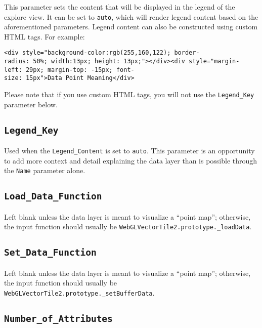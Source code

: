 \documentclass[
]{book}
\begin{document}
This parameter sets the content that will be displayed in the legend of the explore view. It can be set to \texttt{auto}, which will render legend content based on the aforementioned parameters. Legend content can also be constructed using custom HTML tags. For example:

\texttt{\textless{}div\ style="background-color:rgb(255,160,122);\ border-radius:\ 50\%;\ width:13px;\ height:\ 13px;"\textgreater{}\textless{}/div\textgreater{}\textless{}div\ style="margin-left:\ 29px;\ margin-top:\ -15px;\ font-size:\ 15px"\textgreater{}Data\ Point\ Meaning\textless{}/div\textgreater{}}

Please note that if you use custom HTML tags, you will not use the \texttt{Legend\_Key} parameter below.

\hypertarget{legend_key}{%
\subsection*{\texorpdfstring{\texttt{Legend\_Key}}{Legend\_Key}}\label{legend_key}}


Used when the \texttt{Legend\_Content} is set to \texttt{auto}. This parameter is an opportunity to add more context and detail explaining the data layer than is possible through the \texttt{Name} parameter alone.

\hypertarget{load_data_function}{%
\subsection*{\texorpdfstring{\texttt{Load\_Data\_Function}}{Load\_Data\_Function}}\label{load_data_function}}


Left blank unless the data layer is meant to visualize a ``point map''; otherwise, the input function should usually be \texttt{WebGLVectorTile2.prototype.\_loadData}.

\hypertarget{set_data_function}{%
\subsection*{\texorpdfstring{\texttt{Set\_Data\_Function}}{Set\_Data\_Function}}\label{set_data_function}}


Left blank unless the data layer is meant to visualize a ``point map''; otherwise, the input function should usually be \texttt{WebGLVectorTile2.prototype.\_setBufferData}.

\hypertarget{number_of_attributes}{%
\subsection*{\texorpdfstring{\texttt{Number\_of\_Attributes}}{Number\_of\_Attributes}}\label{number_of_attributes}}
\end{document}
